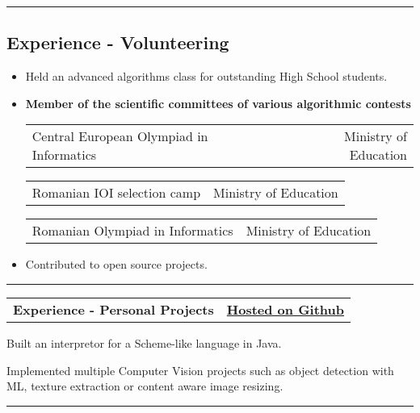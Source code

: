 \documentclass[10pt,letterpaper]{article}
\makeatletter
\newcommand{\headerrow}[2]
{\begin{tabular*}{\linewidth}{l@{\extracolsep{\fill}}r}
	#1 &
	#2 \\
\end{tabular*}}
\makeatother
\begin{document}
\hrule
\vspace{-0.4em}
\subsection*{Experience - Volunteering}

\begin{itemize}

	\item Held an advanced algorithms class for outstanding High School students.

	\item
		{\textbf{Member of the scientific committees of various algorithmic contests}}

	\headerrow
		{Central European Olympiad in Informatics}
		{Ministry of Education}

	\headerrow
		{Romanian IOI selection camp}
		{Ministry of Education}

	\headerrow
		{Romanian Olympiad in Informatics}
		{Ministry of Education}



    \item Contributed to open source projects.

\end{itemize}


\hrule
\vspace{+0.4em}
\begin{flushleft}
\headerrow
	{\textbf{\large{Experience - Personal Projects}}}
	{\textbf{\href{https://github.com/ericpts}{Hosted on Github}}}

\end{flushleft}
	\begin{itemize*}
        \item Built an interpretor for a Scheme-like language in Java.
		\item Implemented multiple Computer Vision projects such as object detection with ML, texture extraction or content aware image resizing.
	\end{itemize*}



\hrule
\end{document}
